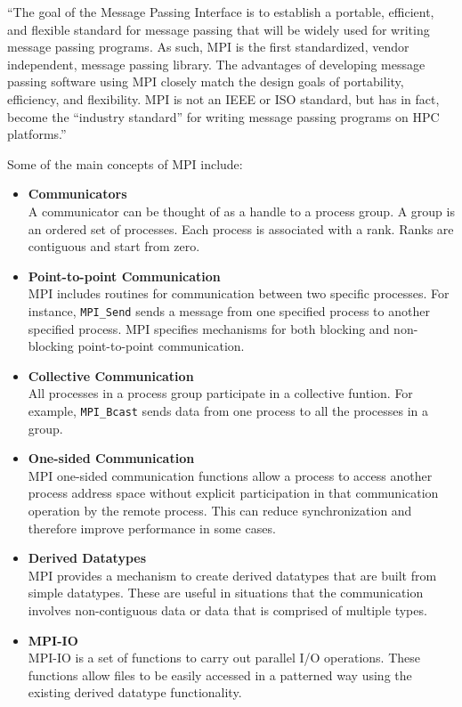 ``The goal of the Message Passing Interface is to establish a portable, efficient, and flexible standard for message passing that will be widely used for writing message passing programs. As such, MPI is the first standardized, vendor independent, message passing library. The advantages of developing message passing software using MPI closely match the design goals of portability, efficiency, and flexibility. MPI is not an IEEE or ISO standard, but has in fact, become the ``industry standard'' for writing message passing programs on HPC platforms.''~\cite{barker2015message}

Some of the main concepts of MPI include:~\cite{snir1998mpi,geist1996mpi,walker1996mpi,gropp1999using}
\begin{itemize}
\item \textbf{Communicators}\\
  A communicator can be thought of as a handle to a process group. A group is an ordered set of processes. Each process is associated with a rank. Ranks are contiguous and start from zero.
  
\item \textbf{Point-to-point Communication}\\
  MPI includes routines for communication between two specific processes. For instance, \verb|MPI_Send| sends a message from one specified process to another specified process. MPI specifies mechanisms for both blocking and non-blocking point-to-point communication. 

\item \textbf{Collective Communication}\\
  All processes in a process group participate in a collective funtion. For example, \verb|MPI_Bcast| sends data from one process to all the processes in a group.
  
\item \textbf{One-sided Communication}\\
  MPI one-sided communication functions allow a process to access another process address space without explicit participation in that communication operation by the remote process. This can reduce synchronization and therefore improve performance in some cases.
  
\item \textbf{Derived Datatypes}\\
  MPI provides a mechanism to create derived datatypes that are built from simple datatypes. These are useful in situations that the communication involves non-contiguous data or data that is comprised of multiple types.

\item \textbf{MPI-IO}\\
  MPI-IO is a set of functions to carry out parallel I/O operations. These functions allow files to be easily accessed in a patterned way using the existing derived datatype functionality.
  
\end{itemize}

